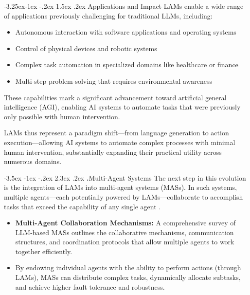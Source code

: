 \documentclass[journal,twoside,10pt]{IEEEtran}
\makeatletter
\renewcommand\section{\@startsection{section}{1}{\z@}%
                       {-3.5ex \@plus -1ex \@minus -.2ex}%
                       {2.3ex \@plus.2ex}%
                       {\normalfont\Large\bfseries\Roman{section}.\quad}}
\renewcommand\subsection{\@startsection{subsection}{2}{\z@}%
                       {-3.25ex\@plus -1ex \@minus -.2ex}%
                       {1.5ex \@plus .2ex}%
                       {\normalfont\large\bfseries}}
\makeatother
\begin{document}
\subsection{Applications and Impact}
LAMs enable a wide range of applications previously challenging for traditional LLMs, including:

\begin{itemize}
    \item Autonomous interaction with software applications and operating systems
    \item Control of physical devices and robotic systems
    \item Complex task automation in specialized domains like healthcare or finance
    \item Multi-step problem-solving that requires environmental awareness
\end{itemize}

These capabilities mark a significant advancement toward artificial general intelligence (AGI), enabling AI systems to automate tasks that were previously only possible with human intervention.

LAMs thus represent a paradigm shift—from language generation to action execution—allowing AI systems to automate complex processes with minimal human intervention, substantially expanding their practical utility across numerous domains.

\section{Multi-Agent Systems}
The next step in this evolution is the integration of LAMs into multi-agent systems (MASs). In such systems, multiple agents—each potentially powered by LAMs—collaborate to accomplish tasks that exceed the capability of any single agent \cite{mas_survey2023}.

\begin{itemize}
    \item \textbf{Multi-Agent Collaboration Mechanisms:} A comprehensive survey of LLM-based MASs outlines the collaborative mechanisms, communication structures, and coordination protocols that allow multiple agents to work together efficiently.
    \item By endowing individual agents with the ability to perform actions (through LAMs), MASs can distribute complex tasks, dynamically allocate subtasks, and achieve higher fault tolerance and robustness.
\end{itemize}
\end{document}

